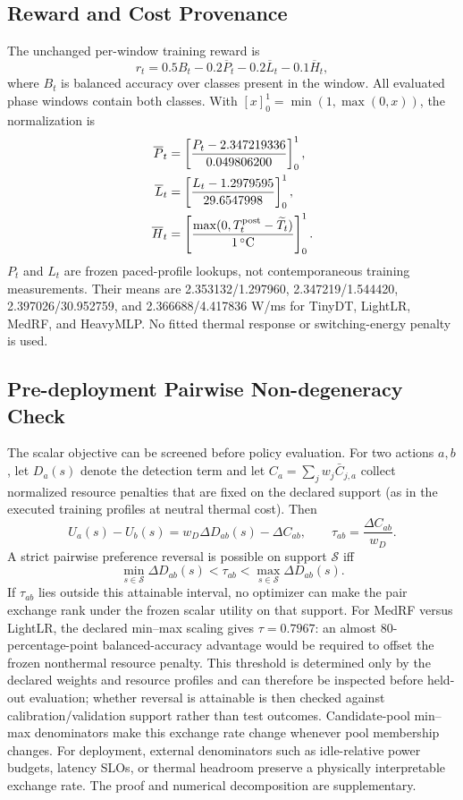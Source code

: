 \subsection{Reward and Cost Provenance}
The unchanged per-window training reward is
\begin{equation}\label{eq:reward}
 r_t=0.5B_t-0.2\overline P_t-0.2\overline L_t-0.1\overline H_t,
\end{equation}
where $B_t$ is balanced accuracy over classes present in the window. All evaluated phase windows contain both classes. With $[x]_0^1=\min(1,\max(0,x))$, the normalization is
\begin{align}
 \overline P_t&=\left[\frac{P_t-2.347219336}{0.049806200}\right]_0^1,\\
 \overline L_t&=\left[\frac{L_t-1.2979595}{29.6547998}\right]_0^1,\\
 \overline H_t&=\left[\frac{\max(0,T_t^{\rm post}-\widetilde T_t)}{1\,{}^\circ\mathrm C}\right]_0^1.
\end{align}
$P_t$ and $L_t$ are frozen \ton{} paced-profile lookups, not contemporaneous training measurements. Their means are 2.353132/1.297960, 2.347219/1.544420, 2.397026/30.952759, and 2.366688/4.417836 W/ms for TinyDT, LightLR, MedRF, and HeavyMLP. No fitted thermal response or switching-energy penalty is used.

\subsection{Pre-deployment Pairwise Non-degeneracy Check}
The scalar objective can be screened before policy evaluation. For two actions $a,b$, let $D_a(s)$ denote the detection term and let $C_a=\sum_j w_j\bar C_{j,a}$ collect normalized resource penalties that are fixed on the declared support (as in the executed training profiles at neutral thermal cost). Then
\begin{equation}
 U_a(s)-U_b(s)=w_D\Delta D_{ab}(s)-\Delta C_{ab},\qquad
 \tau_{ab}=\frac{\Delta C_{ab}}{w_D}.
\end{equation}
A strict pairwise preference reversal is possible on support $\mathcal S$ iff
\begin{equation}\label{eq:nondeg}
 \min_{s\in\mathcal S}\Delta D_{ab}(s)<\tau_{ab}<\max_{s\in\mathcal S}\Delta D_{ab}(s).
\end{equation}
If $\tau_{ab}$ lies outside this attainable interval, no optimizer can make the pair exchange rank under the frozen scalar utility on that support. For MedRF versus LightLR, the declared min--max scaling gives $\tau=0.7967$: an almost 80-percentage-point balanced-accuracy advantage would be required to offset the frozen nonthermal resource penalty. This threshold is determined only by the declared weights and resource profiles and can therefore be inspected before held-out evaluation; whether reversal is attainable is then checked against calibration/validation support rather than test outcomes. Candidate-pool min--max denominators make this exchange rate change whenever pool membership changes. For deployment, external denominators such as idle-relative power budgets, latency SLOs, or thermal headroom preserve a physically interpretable exchange rate. The proof and numerical decomposition are supplementary.

